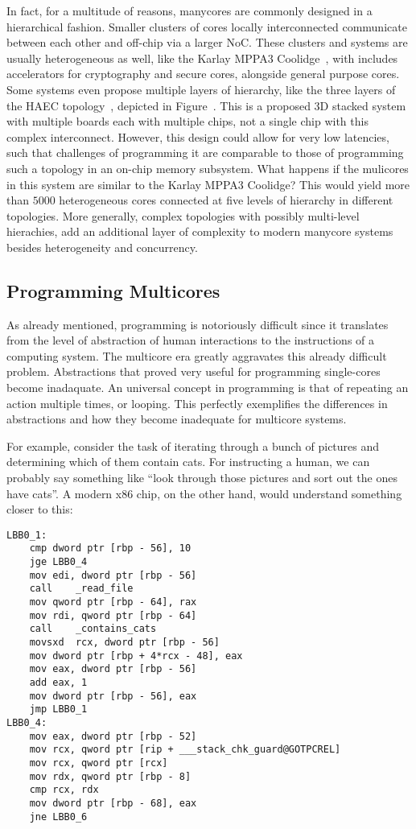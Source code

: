 In fact, for a multitude of reasons, manycores are commonly designed in a hierarchical fashion.
Smaller clusters of cores locally interconnected communicate between each other and off-chip via a larger \ac{NoC}.
These clusters and systems are usually heterogeneous as well, like the Karlay MPPA3 Coolidge~\cite{kalray_coolidge}, with includes accelerators for cryptography and secure cores, alongside general purpose cores.
Some systems even propose multiple layers of hierarchy, like the three layers of the HAEC topology~\cite{HAEC}, depicted in Figure~\cite{fig:haec}.
This is a proposed 3D stacked system with multiple boards each with multiple chips, not a single chip with this complex interconnect.
However, this design could allow for very low latencies, such that challenges of programming it are comparable to those of programming such a topology in an on-chip memory subsystem.
What happens if the mulicores in this system are similar to the Karlay MPPA3 Coolidge? This would yield more than $5000$ heterogeneous cores connected at five levels of hierarchy in different topologies.
More generally, complex topologies with possibly multi-level hierachies, add an additional layer of complexity to modern manycore systems besides heterogeneity and concurrency.

\subsection{Programming Multicores}

As already mentioned, programming is notoriously difficult since it translates from the level of abstraction of human interactions to the instructions of a computing system.
The multicore era greatly aggravates this already difficult problem.
Abstractions that proved very useful for programming single-cores become inadaquate.
An universal concept in programming is that of repeating an action multiple times, or looping. 
This perfectly exemplifies the differences in abstractions and how they become inadequate for multicore systems.

For example, consider the task of iterating through a bunch of pictures and determining which of them contain cats.
For instructing a human, we can probably say something like ``look through those pictures and sort out the ones have cats''.
A modern x86 chip, on the other hand, would understand something closer to this:

\begin{verbatim}
LBB0_1:                                 
	cmp	dword ptr [rbp - 56], 10
	jge	LBB0_4
	mov	edi, dword ptr [rbp - 56]
	call	_read_file
	mov	qword ptr [rbp - 64], rax
	mov	rdi, qword ptr [rbp - 64]
	call	_contains_cats
	movsxd	rcx, dword ptr [rbp - 56]
	mov	dword ptr [rbp + 4*rcx - 48], eax
	mov	eax, dword ptr [rbp - 56]
	add	eax, 1
	mov	dword ptr [rbp - 56], eax
	jmp	LBB0_1
LBB0_4:
	mov	eax, dword ptr [rbp - 52]
	mov	rcx, qword ptr [rip + ___stack_chk_guard@GOTPCREL]
	mov	rcx, qword ptr [rcx]
	mov	rdx, qword ptr [rbp - 8]
	cmp	rcx, rdx
	mov	dword ptr [rbp - 68], eax 
	jne	LBB0_6
\end{verbatim}

